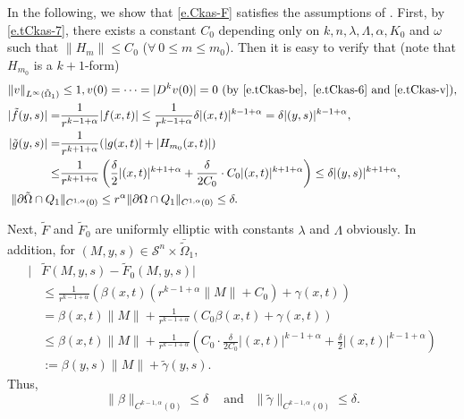 \documentclass[preprint,12pt]{elsarticle}
\theoremstyle{definition}
\theoremstyle{remark}
\numberwithin{equation}{section}
\begin{document}
In the following, we show that \cref{e.Ckas-F} satisfies the assumptions of . First, by \cref{e.tCkas-7}, there exists a constant $C_{0}$ depending only on $k,n,\lambda, \Lambda,\alpha,K_0$ and $\omega$ such that $\|H_m\|\leq C_{0}$ ($\forall~0\leq m\leq m_0$). Then it is easy to verify that (note that $H_{m_0}$ is a $k+1$-form)
\begin{equation*}
\begin{aligned}
\|v\|_{L^{\infty}(\tilde{\Omega}_1)}&\leq 1, v(0)=\cdots=|D^{k}v(0)|=0~(\mathrm{by}~ \cref{e.tCkas-be},~ \cref{e.tCkas-6} ~\mbox{and}~\cref{e.tCkas-v}),\\
|\tilde{f}(y,s)|=& \frac{1}{r^{k-1+\alpha}}|f(x,t)|
\leq \frac{1}{r^{k-1+\alpha}} \delta |(x,t)|^{k-1+\alpha}
= \delta |(y,s)|^{k-1+\alpha},\\
|\tilde{g}(y,s)|=& \frac{1}{r^{k+1+\alpha}}(|g(x,t)|+|H_{m_0}(x,t)|)\\
\leq& \frac{1}{r^{k+1+\alpha}} \left(\frac{\delta}{2}|(x,t)|^{k+1+\alpha}
+\frac{\delta}{2C_0}\cdot C_{0}|(x,t)|^{k+1+\alpha}\right)\leq \delta |(y,s)|^{k+1+\alpha},\\
\|\partial \tilde{\Omega}\cap Q_1&\|_{C^{1,\alpha}(0)}\leq r^{\alpha}\|\partial\Omega\cap Q_1\|_{C^{1,\alpha}(0)}\leq \delta.
  \end{aligned}
\end{equation*}

Next, $\tilde{F}$ and $\tilde{F}_0$ are uniformly elliptic with constants $\lambda$ and $\Lambda$ obviously. In addition, for $(M,y,s)\in \mathcal{S}^{n}\times \bar{\tilde{\Omega}}_1$,
\begin{equation}\label{e.9.1}
\begin{aligned}
|&\tilde{F}(M,y,s)-\tilde{F}_0(M,y,s)|\\
&\leq \frac{1}{r^{k-1+\alpha}}\left(\beta(x,t)\left(r^{k-1+\alpha}\|M\|+C_0\right)
+\gamma(x,t)\right)\\
&= \beta(x,t)\|M\|+\frac{1}{r^{k-1+\alpha}}\left(C_0\beta(x,t)+\gamma(x,t)\right)\\
&\leq \beta(x,t)\|M\|+\frac{1}{r^{k-1+\alpha}}\left(C_0\cdot\frac{\delta}{2C_0}|(x,t)|^{k-1+\alpha}
+\frac{\delta}{2}|(x,t)|^{k-1+\alpha}\right)\\
&:= \beta(y,s)\|M\|+\tilde{\gamma}(y,s).
\end{aligned}
\end{equation}
Thus,
\begin{equation*}
\|\beta\|_{C^{k-1,\alpha}(0)}\leq \delta
~~~~\mbox{ and }~~\|\tilde{\gamma}\|_{C^{k-1,\alpha}(0)}\leq \delta.
\end{equation*}
\end{document}
